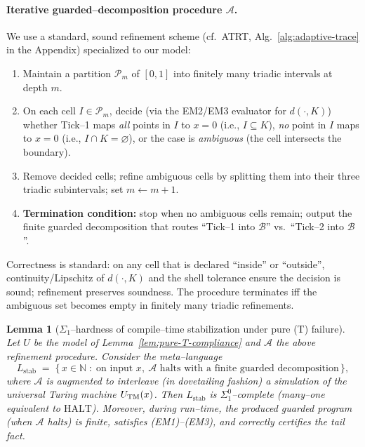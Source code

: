 \documentclass[12pt]{article}
\theoremstyle{definition}
\theoremstyle{plain}
\newtheorem{lemma}{Lemma}[section]
\begin{document}
\paragraph{Iterative guarded–decomposition procedure \(\mathcal A\).}
We use a standard, sound refinement scheme (cf.\ ATRT, Alg.~\ref{alg:adaptive-trace} in the Appendix) specialized to our model:

\begin{enumerate}[label=\arabic*. , itemsep=2pt, leftmargin=2em]
  \item Maintain a partition \(\mathcal P_m\) of \([0,1]\) into finitely many triadic intervals at depth \(m\).
  \item On each cell \(I\in\mathcal P_m\), decide (via the EM2/EM3 evaluator for \(d(\cdot,K)\)) whether Tick–1 maps \emph{all} points in \(I\) to \(x=0\) (i.e., \(I\subseteq K\)), \emph{no} point in \(I\) maps to \(x=0\) (i.e., \(I\cap K=\varnothing\)), or the case is \emph{ambiguous} (the cell intersects the boundary).
  \item Remove decided cells; refine ambiguous cells by splitting them into their three triadic subintervals; set \(m\gets m+1\).
  \item \textbf{Termination condition:} stop when no ambiguous cells remain; output the finite guarded decomposition that routes “Tick–1 into \(\mathcal B\)” vs.\ “Tick–2 into \(\mathcal B\)”.
\end{enumerate}

Correctness is standard: on any cell that is declared “inside” or “outside”, continuity/Lipschitz of \(d(\cdot,K)\) and the shell tolerance ensure the decision is sound; refinement preserves soundness. The procedure terminates iff the ambiguous set becomes empty in finitely many triadic refinements.

\begin{lemma}[\(\Sigma_1\)–hardness of compile–time stabilization under pure (T) failure]
\label{lem:pure-T-hardness}
Let \(U\) be the model of Lemma~\ref{lem:pure-T-compliance} and \(\mathcal A\) the above refinement procedure. Consider the meta–language
\[
  L_{\mathrm{stab}}
  \;=\;
  \bigl\{\,x\in\mathbb N\;:\;\text{on input }x,\ \mathcal A \text{ halts with a finite guarded decomposition}\,\bigr\},
\]
where \(\mathcal A\) is augmented to \emph{interleave} (in dovetailing fashion) a simulation of the universal Turing machine \(U_{\rm TM}(x)\).
Then \(L_{\mathrm{stab}}\) is \(\Sigma^0_1\)–complete (many–one equivalent to \(\mathrm{HALT}\)).
Moreover, during run–time, the produced guarded program (when \(\mathcal A\) halts) is finite, satisfies (EM1)–(EM3), and correctly certifies the tail fact.
\end{lemma}
\end{document}
